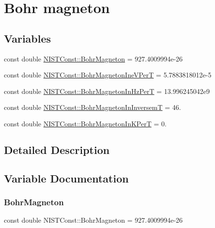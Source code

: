 \hypertarget{group___n_i_s_t_const-_bohr_magneton}{}\section{Bohr magneton}
\label{group___n_i_s_t_const-_bohr_magneton}
\subsection*{Variables}
\begin{DoxyCompactItemize}
\item 
const double \hyperlink{group___n_i_s_t_const-_bohr_magneton_gaace59be8951a23257cedcbef8f320c66}{N\+I\+S\+T\+Const\+::\+Bohr\+Magneton} = 927.\+4009994e-\/26
\item 
const double \hyperlink{group___n_i_s_t_const-_bohr_magneton_ga8b97d10b13a2c5de4f0d268370bc3c50}{N\+I\+S\+T\+Const\+::\+Bohr\+Magneton\+Ine\+V\+PerT} = 5.\+7883818012e-\/5
\item 
const double \hyperlink{group___n_i_s_t_const-_bohr_magneton_ga0c3cc268d0e1abc4703ea8f2c11ccab8}{N\+I\+S\+T\+Const\+::\+Bohr\+Magneton\+In\+Hz\+PerT} = 13.\+996245042e9
\item 
const double \hyperlink{group___n_i_s_t_const-_bohr_magneton_ga5d2bdfa6451f3966c0e4ce0d76da7880}{N\+I\+S\+T\+Const\+::\+Bohr\+Magneton\+In\+InversemT} = 46.
\item 
const double \hyperlink{group___n_i_s_t_const-_bohr_magneton_ga4fcb81eff2823748ae5fced898ecc0ec}{N\+I\+S\+T\+Const\+::\+Bohr\+Magneton\+In\+K\+PerT} = 0.
\end{DoxyCompactItemize}


\subsection{Detailed Description}


\subsection{Variable Documentation}
\mbox{\label{group___n_i_s_t_const-_bohr_magneton_gaace59be8951a23257cedcbef8f320c66}} 
\subsubsection{\texorpdfstring{Bohr\+Magneton}{BohrMagneton}}
{\footnotesize\ttfamily const double N\+I\+S\+T\+Const\+::\+Bohr\+Magneton = 927.\+4009994e-\/26}

